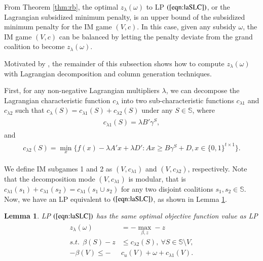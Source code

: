 \documentclass[authoryear,review,12pt]{elsarticle}
\newtheorem{lemma}{Lemma}
\begin{document}
From Theorem \ref{thm:rb}, %
the optimal $z_{\lambda}(\omega)$ to LP $(\ref{eqn:laSLC})$, or the Lagrangian subsidized minimum penalty, is an upper bound of the subsidized minimum penalty for the IM game $(V,c)$.
In this case, given any subsidy $\omega$, the IM game $(V,c)$ can be balanced by letting the penalty deviate from the grand coalition to become $z_{\lambda}(\omega)$. %


Motivated by \cite{LRCA2016}, the remainder of this subsection shows how to compute $z_{\lambda}(\omega)$ with Lagrangian decomposition and column generation techniques.


First, for any non-negative Lagrangian multipliers $\lambda$, we can decompose the Lagrangian characteristic function $c_{\lambda}$ into two sub-characteristic functions $c_{\lambda1}$ and $c_{\lambda2}$ such that $c_{\lambda}(S) = c_{\lambda1}(S) + c_{\lambda2}(S)$ under any $S \in \mathbb{S}$, where
\begin{eqnarray*}\label{eqn:subcf1}
\begin{aligned}
c_{\lambda1}(S) = \lambda  B'\gamma^S,
\end{aligned}
\end{eqnarray*}
 and
 \begin{eqnarray*}\label{eqn:subcf2}
\begin{aligned}
c_{\lambda2}(S) = \min_x \bigg\{ f(x)-\lambda A'x  + \lambda D':Ax \geq B\gamma^S + D, x \in \{0,1\}^{t \times 1} \bigg\}.
\end{aligned}
\end{eqnarray*}

We define IM subgames 1 and 2 as $(V,c_{\lambda1})$ and $(V,c_{\lambda2})$, respectively. Note that the decomposition mode $(V,c_{\lambda1})$ is modular, that is $c_{\lambda1}(s_1)+c_{\lambda1}(s_2) = c_{\lambda1}(s_1 \cup s_2)$ for any two disjoint coalitions $s_1, s_2 \in \mathbb{S}$. Now, we have an LP equivalent to $(\ref{eqn:laSLC})$, as shown in Lemma \ref{lemma:equivalentLP}.


\begin{lemma}\label{lemma:equivalentLP}
LP $(\ref{eqn:laSLC})$ has the same optimal objective function value as LP
\begin{eqnarray}\label{eqn:l2aSLC}
\begin{aligned}
z_{\lambda}(\omega) &= -\max_{\beta,z} -z\\
s.t. ~~ \beta(S) - z &\leq  c_{\lambda2}(S),~ \forall S \in \mathbb{S} \setminus V,\\
 -\beta(V) \leq  -&c_u(V) + \omega  + c_{\lambda1}(V).
\end{aligned}
\end{eqnarray}
\end{lemma}
\end{document}
